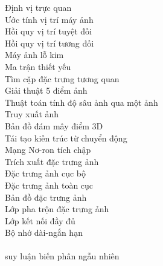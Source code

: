 \begin{keyword}
    		    {Định vị trực quan} 		    \\
    		{Ước tính vị trí máy ảnh} 		\\
    		{Hồi quy vị trí tuyệt đối} 		\\
    		{Hồi quy vị trí tương đối} 		\\
    		        {Máy ảnh lỗ kim} 	        	\\
    		        {Ma trận thiết yếu} 		    \\
    		        {Tìm cặp đặc trưng tương quan} 	\\
    		        {Giải thuật 5 điểm ảnh} 		\\
    	{Thuật toán tính độ sâu ảnh qua một ảnh} 		\\
    		        {Truy xuất ảnh} 	        	\\
    		        {Bản đồ đám mây điểm 3D} 		\\
    		    {Tái tạo kiến trúc từ chuyển động} 	\\
    		{Mạng Nơ-ron tích chập} 		\\
    	        {Trích xuất đặc trưng ảnh} 		\\
    		        {Đặc trưng ảnh cục bộ} 	        \\
                 {Đặc trưng ảnh toàn cục}        \\
                       {Bản đồ đặc trưng ảnh}          \\ 
                     {Lớp pha trộn đặc trưng ảnh}    \\ 
             {Lớp kết nối đầy đủ}            \\ 
            {Bộ nhớ dài-ngắn hạn}           \\ 
     \\
      {suy luận biến phân ngẫu nhiên} \\

\end{keyword}
